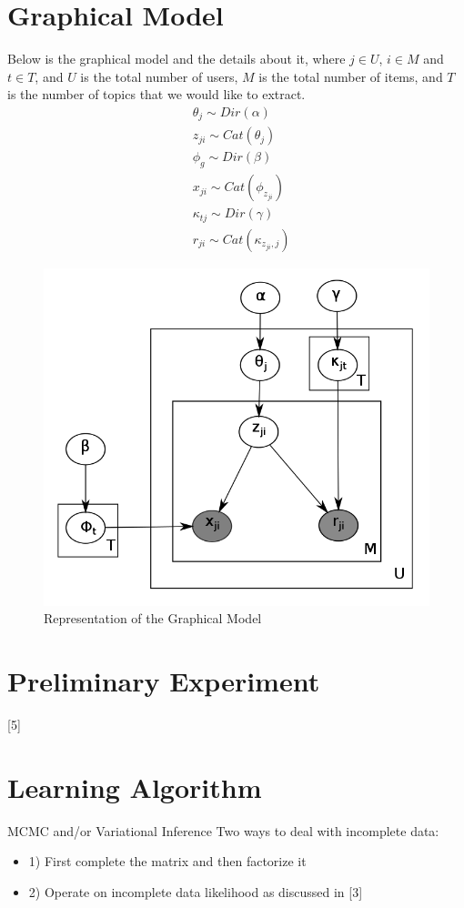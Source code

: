 \documentclass{article} %
\begin{document}
\section{Graphical Model}
\label{graph}
Below is the graphical model and the details about it, where $j \in U$, $i \in M$ 
and $t \in T$, and $U$ is the total number of users, $M$ is the total number of items, 
and $T$ is the number of topics that we would like to extract. 
\begin{align*}
  &\theta_j \sim Dir(\alpha)\\
  &z_{ji} \sim Cat(\theta_j)\\
  &\phi_g \sim Dir(\beta)\\
  &x_{ji} \sim Cat(\phi_{z_{ji}}) \\
  &\kappa_{tj} \sim Dir(\gamma)\\
  &r_{ji} \sim Cat(\kappa_{z_{ji},j})
\end{align*}
\clearpage
\begin{figure}[h]
    \begin{center}
      \includegraphics[width=.5\textwidth]{model.png}
      \caption{Representation of the Graphical Model}
      \label{fig:plot1}
    \end{center}
  \end{figure}

\section{Preliminary Experiment}
\label{exp}
[5]

\section{Learning Algorithm}
\label{alg}
MCMC and/or Variational Inference
Two ways to deal with incomplete data: 
\begin{itemize}
	\item 1) First complete the matrix and then factorize it
	\item 2) Operate on incomplete data likelihood as discussed in [3]
\end{itemize}
\end{document}
